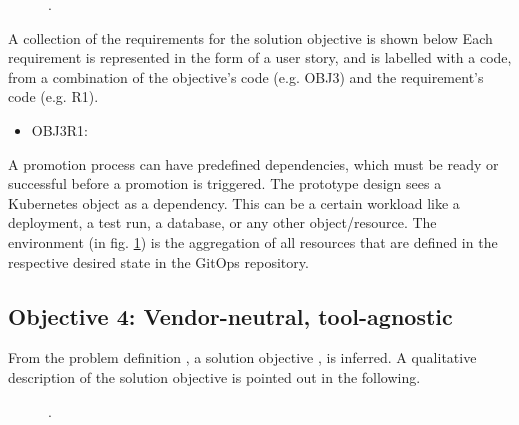 \begin{figure}[h]
	\centering
	\caption{.
	}
	\label{fig:OBJ3R1}	
\end{figure}

A collection of the requirements for the solution objective is shown below
Each requirement is represented in the form of a user story,
and is labelled with a code, from a combination of the
objective's code (e.g. OBJ3) and the requirement's code (e.g. R1).

\begin{itemize}
	\item OBJ3R1: 
\end{itemize}

A promotion process can have predefined dependencies, which must be ready or successful
before a promotion is triggered.
The prototype design sees a Kubernetes object as a dependency. This can be a certain
workload like a deployment, a test run, a database, or any other object/resource.
The environment (in fig. \ref{fig:OBJ3R1}) is the aggregation of all resources
that are defined in the respective desired state in the GitOps repository.

\subsection{Objective 4: Vendor-neutral, tool-agnostic}
\label{objective4}

From the problem definition
\textit{},
a solution objective
\textit{},
is inferred.
A qualitative description of the solution objective
is pointed out in the following.

\begin{figure}[h]
	\centering
	\caption{.
	}
	\label{fig:OBJ4R1}	
\end{figure}

